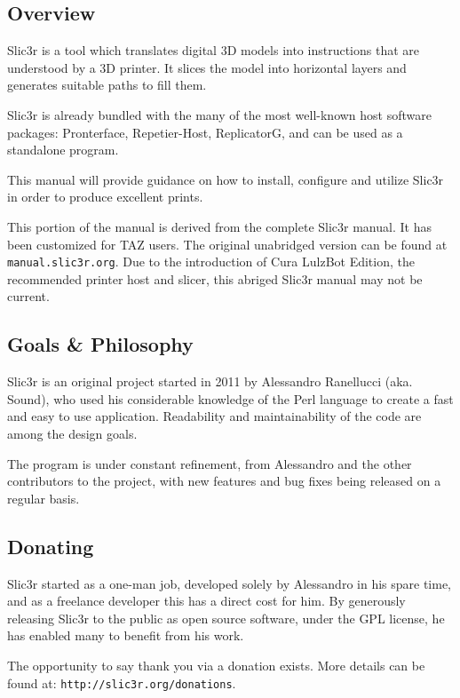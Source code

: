
\subsection{Overview} %
\label{sec:overview}

Slic3r is a tool which translates digital 3D models into instructions that are understood by a 3D printer.  It slices the model into horizontal layers and generates suitable paths to fill them.

Slic3r is already bundled with the many of the most well-known host software packages: Pronterface, Repetier-Host, ReplicatorG, and can be used as a standalone program.

This manual will provide guidance on how to install, configure and utilize Slic3r in order to produce excellent prints.

This portion of the manual is derived from the complete Slic3r manual. It has been customized for TAZ users. The original unabridged version can be found at \texttt{manual.slic3r.org}. Due to the introduction of Cura LulzBot\textsuperscript{\miniscule{\texttrademark}} Edition, the recommended printer host and slicer, this abriged Slic3r manual may not be current.



\subsection{Goals \& Philosophy} %
\label{sec:goals_philosophy}

Slic3r is an original project started in 2011 by Alessandro Ranellucci (aka. Sound), who used his considerable knowledge of the Perl language to create a fast and easy to use application.  Readability and maintainability of the code are among the design goals.

The program is under constant refinement, from Alessandro and the other contributors to the project, with new features and bug fixes being released on a regular basis.



\subsection{Donating} %
\label{sec:donating}

Slic3r started as a one-man job, developed solely by Alessandro in his spare time, and as a freelance developer this has a direct cost for him.  By generously releasing Slic3r to the public as open source software, under the GPL license, he has enabled many to benefit from his work.

The opportunity to say thank you via a donation exists.  More details can be found at: \texttt{http://slic3r.org/donations}.

